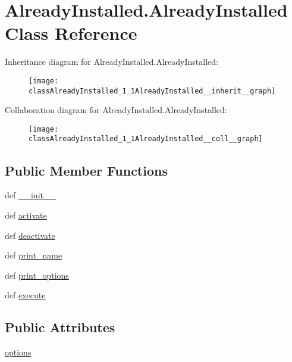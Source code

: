 \hypertarget{classAlreadyInstalled_1_1AlreadyInstalled}{\section{Already\-Installed.\-Already\-Installed Class Reference}
\label{classAlreadyInstalled_1_1AlreadyInstalled}
}


Inheritance diagram for Already\-Installed.\-Already\-Installed\-:\nopagebreak
\begin{figure}[H]
\begin{center}
\leavevmode
\texttt{[image: classAlreadyInstalled\_1\_1AlreadyInstalled\_\_inherit\_\_graph]}
\end{center}
\end{figure}


Collaboration diagram for Already\-Installed.\-Already\-Installed\-:\nopagebreak
\begin{figure}[H]
\begin{center}
\leavevmode
\texttt{[image: classAlreadyInstalled\_1\_1AlreadyInstalled\_\_coll\_\_graph]}
\end{center}
\end{figure}
\subsection*{Public Member Functions}
\begin{DoxyCompactItemize}
\item 
def \hyperlink{classAlreadyInstalled_1_1AlreadyInstalled_ad412a2ca55660bde9d102ffffea5685f}{\-\_\-\-\_\-init\-\_\-\-\_\-}
\item 
def \hyperlink{classAlreadyInstalled_1_1AlreadyInstalled_aa69327b411af4bc2cd43f2bbf07cfe56}{activate}
\item 
def \hyperlink{classAlreadyInstalled_1_1AlreadyInstalled_a895aa66471ba8b5d4f67f8d17df5131c}{deactivate}
\item 
def \hyperlink{classAlreadyInstalled_1_1AlreadyInstalled_a63ce43492cf6c53f23a19a444109bfa8}{print\-\_\-name}
\item 
def \hyperlink{classAlreadyInstalled_1_1AlreadyInstalled_a8061d145324dbf058b17bc16579e9d5f}{print\-\_\-options}
\item 
def \hyperlink{classAlreadyInstalled_1_1AlreadyInstalled_af1afb26d21ce30a80e68c834245baeda}{execute}
\end{DoxyCompactItemize}
\subsection*{Public Attributes}
\begin{DoxyCompactItemize}
\item 
\hyperlink{classAlreadyInstalled_1_1AlreadyInstalled_af9247ff7a3b5dab409644868b7cc34e3}{options}
\end{DoxyCompactItemize}


